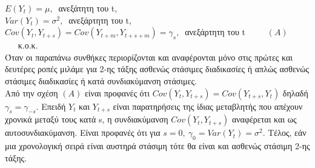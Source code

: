 $E \left(Y_t\right)=\mu,\:$ ανεξάτητη του t,\\

$Var \left(Y_t \right) = \sigma^2,\:$ ανεξάρτητη του t,\\

$Cov\left(Y_t,Y_{t+s}\right)=Cov\left(Y_{t+m},Y_{t+s+m}\right)=\gamma_s,\:$ ανεξάρτητη του t $\quad  \quad \: \left( A \right)$\\
$\quad \:$ κ.ο.κ.\\
Όταν οι παραπάνω συνθήκες περιορίζονται και αναφέρονται μόνο στις πρώτες και δευτέρες ροπές μιλάμε για 2-ης τάξης ασθενώς στάσιμες διαδικασίες ή απλώς ασθενώς
στάσιμες διαδικασίες ή κατά συνδιακύμανση στάσιμες.\\

Από την σχέση $ \left( A \right)$ είναι προφανές ότι $ Cov \left( Y_t,Y_{t+s}\right)=Cov \left(Y_{t+s},Y_t\right) $ δηλαδή $\gamma_s=\gamma_{-s}$. Επειδή $ Y_t $ και $ Y_{t+s} $ είναι παρατηρήσεις της ίδιας μεταβλητής που απέχουν χρονικά μεταξύ τους κατά s, η συνδιακύμανση $ Cov \left( Y_t,Y_{t+s}\right)$
αναφέρεται και ως αυτοσυνδιακύμανση. Είναι προφανές ότι για $ s=0,\: \gamma_0 = Var \left(Y_t \right)= \sigma^2.$ Τέλος, εάν
μια χρονολογική σειρά είναι αυστηρά στάσιμη τότε θα είναι και ασθενώς στάσιμη 2-ης
τάξης.




